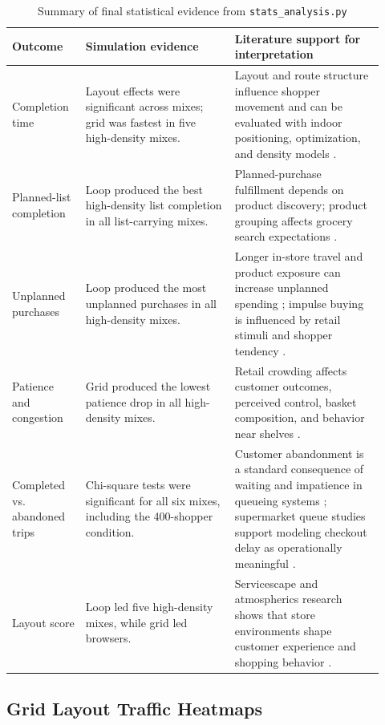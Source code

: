 \documentclass[sigconf,nonacm]{acmart}
\begin{document}
\begin{table}[t]
\caption{Summary of final statistical evidence from \texttt{stats\_analysis.py}}
\label{tab:stat-summary}
\small
\begin{tabular}{@{}p{0.18\linewidth}p{0.37\linewidth}p{0.37\linewidth}@{}}
\toprule
\textbf{Outcome} & \textbf{Simulation evidence} & \textbf{Literature support for interpretation} \\
\midrule
Completion time & Layout effects were significant across mixes; grid was fastest in five high-density mixes. & Layout and route structure influence shopper movement and can be evaluated with indoor positioning, optimization, and density models \citep{hwangbo2017,ozgormus2020,pantano2021}. \\
Planned-list completion & Loop produced the best high-density list completion in all list-carrying mixes. & Planned-purchase fulfillment depends on product discovery; product grouping affects grocery search expectations \citep{seva2019,andrada2020}. \\
Unplanned purchases & Loop produced the most unplanned purchases in all high-density mixes. & Longer in-store travel and product exposure can increase unplanned spending \citep{hui2013}; impulse buying is influenced by retail stimuli and shopper tendency \citep{bellini2017,kacen2012}. \\
Patience and congestion & Grid produced the lowest patience drop in all high-density mixes. & Retail crowding affects customer outcomes, perceived control, basket composition, and behavior near shelves \citep{blut2020,aydinli2021,luck2015}. \\
Completed vs. abandoned trips & Chi-square tests were significant for all six mixes, including the 400-shopper condition. & Customer abandonment is a standard consequence of waiting and impatience in queueing systems \citep{dai2013}; supermarket queue studies support modeling checkout delay as operationally meaningful \citep{mohamad2022,chandra2023}. \\
Layout score & Loop led five high-density mixes, while grid led browsers. & Servicescape and atmospherics research shows that store environments shape customer experience and shopping behavior \citep{mari2013,spence2014}. \\
\bottomrule
\end{tabular}
\end{table}

\subsection{Grid Layout Traffic Heatmaps}
\end{document}
